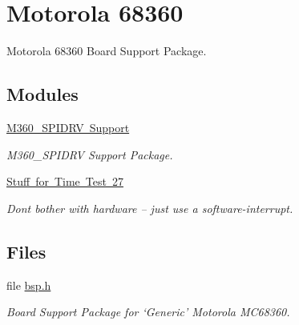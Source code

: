 \hypertarget{group__RTEMSBSPsM68kGen68360}{}\section{Motorola 68360}
\label{group__RTEMSBSPsM68kGen68360}


Motorola 68360 Board Support Package.  


\subsection*{Modules}
\begin{DoxyCompactItemize}
\item 
\mbox{\hyperlink{group__m68k__m360spi}{M360\+\_\+\+S\+P\+I\+D\+R\+V Support}}
\begin{DoxyCompactList}\small\item\em M360\+\_\+\+S\+P\+I\+D\+RV Support Package. \end{DoxyCompactList}\item 
\mbox{\hyperlink{group__m68k__tm27}{Stuff for Time Test 27}}
\begin{DoxyCompactList}\small\item\em Don\textquotesingle{}t bother with hardware -- just use a software-\/interrupt. \end{DoxyCompactList}\end{DoxyCompactItemize}
\subsection*{Files}
\begin{DoxyCompactItemize}
\item 
file \mbox{\hyperlink{bsps_2m68k_2gen68360_2include_2bsp_8h}{bsp.\+h}}
\begin{DoxyCompactList}\small\item\em Board Support Package for `Generic' Motorola M\+C68360. \end{DoxyCompactList}\end{DoxyCompactItemize}
